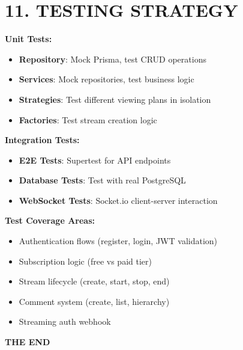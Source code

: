 \documentclass[10pt]{article}
\begin{document}
\section*{\color{primary} 11. TESTING STRATEGY}

\noindent
\begin{tcolorbox}[
  colback=white,
  colframe=dark,
  arc=3pt,
  boxrule=1pt,
  before skip=8pt,
  after skip=8pt
]

\textbf{Unit Tests:}
\begin{itemize}
\item \textbf{Repository}: Mock Prisma, test CRUD operations
\item \textbf{Services}: Mock repositories, test business logic
\item \textbf{Strategies}: Test different viewing plans in isolation
\item \textbf{Factories}: Test stream creation logic
\end{itemize}

\textbf{Integration Tests:}
\begin{itemize}
\item \textbf{E2E Tests}: Supertest for API endpoints
\item \textbf{Database Tests}: Test with real PostgreSQL
\item \textbf{WebSocket Tests}: Socket.io client-server interaction
\end{itemize}

\textbf{Test Coverage Areas:}
\begin{itemize}
\item Authentication flows (register, login, JWT validation)
\item Subscription logic (free vs paid tier)
\item Stream lifecycle (create, start, stop, end)
\item Comment system (create, list, hierarchy)
\item Streaming auth webhook
\end{itemize}

\end{tcolorbox}

\begin{center}
\color{primary}
\Large\bfseries
THE END
\end{center}

\vspace{8pt}
\end{document}
